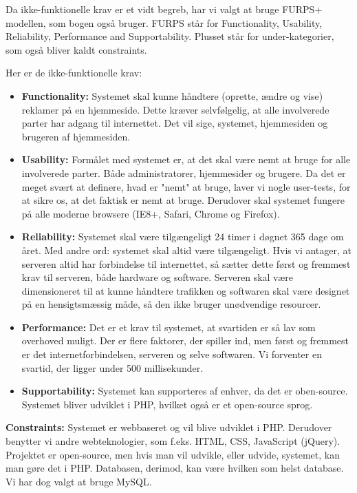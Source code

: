 \documentclass[a4paper,12pt]{article}
\begin{document}
Da ikke-funktionelle krav er et vidt begreb, har vi valgt at bruge FURPS+ modellen, som bogen også bruger. FURPS står for Functionality, Usability, Reliability, Performance and Supportability. Plusset står for under-kategorier, som også bliver kaldt constraints.

Her er de ikke-funktionelle krav:
\begin{itemize}
	\item \textbf{Functionality:} Systemet skal kunne håndtere (oprette, ændre og vise) reklamer på en hjemmeside. Dette kræver selvfølgelig, at alle involverede parter har adgang til internettet. Det vil sige, systemet, hjemmesiden og brugeren af hjemmesiden.
	\item \textbf{Usability:} Formålet med systemet er, at det skal være nemt at bruge for alle involverede parter. Både administratorer, hjemmesider og brugere. Da det er meget svært at definere, hvad er "nemt" at bruge, laver vi nogle user-tests, for at sikre os, at det faktisk er nemt at bruge. Derudover skal systemet fungere på alle moderne browsere (IE8+, Safari, Chrome og Firefox).
	\item \textbf{Reliability:} Systemet skal være tilgængeligt 24 timer i døgnet 365 dage om året. Med andre ord: systemet skal altid være tilgængeligt. Hvis vi antager, at serveren altid har forbindelse til internettet, så sætter dette først og fremmest krav til serveren, både hardware og software. Serveren skal være dimensioneret til at kunne håndtere trafikken og softwaren skal være designet på en hensigtsmæssig måde, så den ikke bruger unødvendige resourcer.
	\item \textbf{Performance:} Det er et krav til systemet, at svartiden er så lav som overhoved muligt. Der er flere faktorer, der spiller ind, men først og fremmest er det internetforbindelsen, serveren og selve softwaren. Vi forventer en svartid, der ligger under 500 millisekunder.
	\item \textbf{Supportability:} Systemet kan supporteres af enhver, da det er oben-source. Systemet bliver udviklet i PHP, hvilket også er et open-source sprog.
\end{itemize}

\textbf{Constraints:} Systemet er webbaseret og vil blive udviklet i PHP. Derudover benytter vi andre webteknologier, som f.eks. HTML, CSS, JavaScript (jQuery). Projektet er open-source, men hvis man vil udvikle, eller udvide, systemet, kan man gøre det i PHP. Databasen, derimod, kan være hvilken som helst database. Vi har dog valgt at bruge MySQL.
\end{document}
